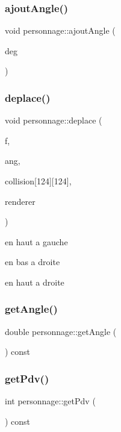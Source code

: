 \subsubsection{\texorpdfstring{ajout\+Angle()}{ajoutAngle()}}
{\footnotesize\ttfamily void personnage\+::ajout\+Angle (\begin{DoxyParamCaption}\item[{double}]{deg }\end{DoxyParamCaption})}

\mbox{\label{classpersonnage_a932b426b05f6a09941eb7a2779ca077b}} 
\subsubsection{\texorpdfstring{deplace()}{deplace()}}
{\footnotesize\ttfamily void personnage\+::deplace (\begin{DoxyParamCaption}\item[{float}]{f,  }\item[{double}]{ang,  }\item[{int}]{collision\mbox{[}124\mbox{]}\mbox{[}124\mbox{]},  }\item[{S\+D\+L\+\_\+\+Renderer $\ast$}]{renderer }\end{DoxyParamCaption})}

en haut a gauche

en bas a droite

en haut a droite \mbox{\label{classpersonnage_a7cb609dc21ef3bc8623cb9b670438970}} 
\subsubsection{\texorpdfstring{get\+Angle()}{getAngle()}}
{\footnotesize\ttfamily double personnage\+::get\+Angle (\begin{DoxyParamCaption}{ }\end{DoxyParamCaption}) const}

\mbox{\label{classpersonnage_a844ee07a1421658afa75ef307a5646dc}} 
\subsubsection{\texorpdfstring{get\+Pdv()}{getPdv()}}
{\footnotesize\ttfamily int personnage\+::get\+Pdv (\begin{DoxyParamCaption}{ }\end{DoxyParamCaption}) const}

